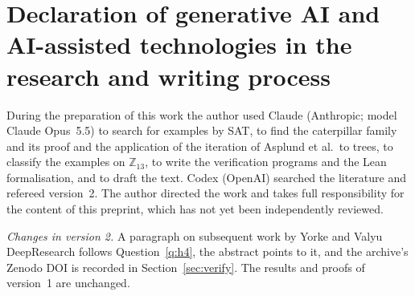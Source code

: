 \documentclass[11pt]{amsart}
\theoremstyle{definition}
\begin{document}
\section*{Declaration of generative AI and AI-assisted technologies in the research and writing process}
During the preparation of this work the author used Claude (Anthropic; model Claude Opus~5.5) to search for
examples by SAT, to find the caterpillar family and its proof and the application of the iteration of Asplund et
al.\ to trees, to classify the examples on $\mathbb{Z}_{13}$, to write the verification programs and the Lean
formalisation, and to draft the text. Codex (OpenAI) searched the literature and refereed version~2. The author
directed the work and takes full responsibility for the content of this preprint, which has not yet been
independently reviewed.

\emph{Changes in version 2.} A paragraph on subsequent work by Yorke and Valyu DeepResearch \cite{YV} follows
Question~\ref{q:h4}, the abstract points to it, and the archive's Zenodo DOI is recorded in
Section~\ref{sec:verify}. The results and proofs of version~1 are unchanged.
\end{document}
